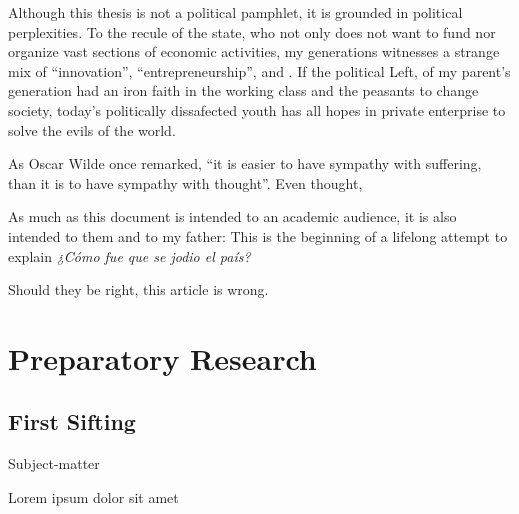\documentclass[paper=B6,portrait,twoside=true,twocolumn=false,headinclude=true,footinclude=false,fontsize=12,BCOR=10mm,DIV=calc,pagesize=auto,titlepage=firstiscover,mpinclude=false,headings=normal,headings=twolinechapter,open=right,toc=graduated,chapterprefix=false,numbers=endperiod,parskip=half+]{scrbook}
\theoremstyle{definition}
\begin{document}
Although this thesis is not a political pamphlet, it is grounded in
political perplexities. To the recule of the state, who not only does not
want to fund nor organize vast sections of economic activities, my
generations witnesses a strange mix of ``innovation'',
``entrepreneurship'', and . If the political Left, of my parent's
generation had an iron faith in the working class and the peasants to
change society, today's politically dissafected youth has all hopes in
private enterprise to solve the evils of the world.

As Oscar Wilde once remarked, ``it is easier to have sympathy with
suffering, than it is to have sympathy with thought''. Even thought,

As much as this document is intended to an academic audience, it is also
intended to them and to my father: This is the beginning of a lifelong
attempt to explain \emph{¿Cómo fue que se jodio el país?} 

Should they be right, this article is wrong. 

\mainmatter
\pagestyle{scrheadings}
\part{Preparatory Research}
\label{sec:orgd01abbe}
\chapter{First Sifting}
\label{sec:org52f8578}
   \begin{labeling}[~]{Subject-matter} 
\item[Subject-matter] Lorem ipsum dolor sit amet
\end{labeling}
\end{document}

